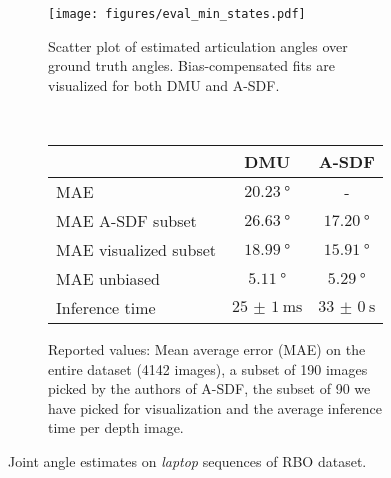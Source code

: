\documentclass[letterpaper, 10 pt, journal, twoside]{ieeetran}  %
\begin{document}
\begin{figure}[htp]
    \begin{subfigure}{1.0\columnwidth}
        \texttt{[image: figures/eval\_min\_states.pdf]}
        \caption{Scatter plot of estimated articulation angles over ground truth angles. Bias-compensated fits are visualized for both DMU and A-SDF.}
        \label{fig:rbo_scatter}
    \end{subfigure}\\
    \begin{subfigure}{1.0\linewidth}
        \centering
        \begin{tabular}{l c c }
            \toprule
                & DMU       & A-SDF       \\
            \midrule
        MAE & $\SI{20.23}{\degree}$     & -     \\
        MAE A-SDF subset & $\SI{26.63}{\degree}$     & $\SI{17.20}{\degree}$   \\
        MAE visualized subset  & $\SI{18.99}{\degree}$   & $\SI{15.91}{\degree}$     \\
        MAE unbiased  & $\SI{5.11}{\degree}$   & $\SI{5.29}{\degree}$     \\
        Inference time & $\SI{25(1)}{\milli\second}$ & $\SI{33(0)}{\second}$   \\
            \bottomrule
        \end{tabular}
    \caption{Reported values: Mean average error (MAE) on the entire dataset (4142 images), a  subset of 190 images picked by the authors of A-SDF, the subset of 90 we have picked for visualization and the average inference time per depth image.}
    \label{tab:rbo}
    \end{subfigure}
\caption{Joint angle estimates on \textit{laptop} sequences of RBO dataset. }
\label{fig:rbo}
\end{figure}
\end{document}
